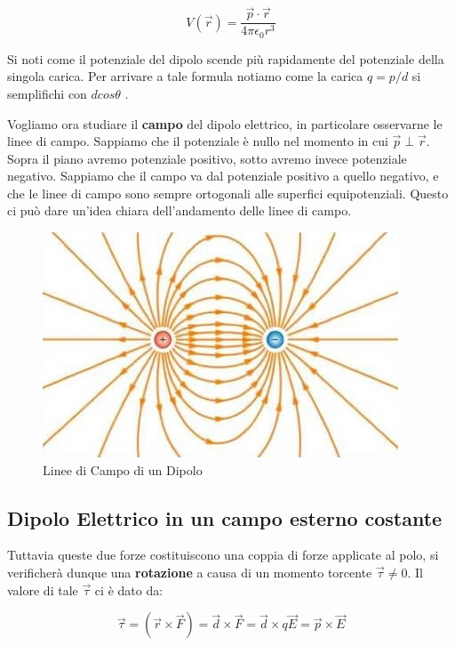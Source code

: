 $$ 
V(\vec{r}) = \frac{\vec{p} \cdot \vec{r}}{4\pi\epsilon_0 r^3}
$$ 

Si noti come il potenziale del dipolo scende più rapidamente del potenziale della singola carica. Per arrivare a tale formula notiamo come la carica $q = p/d$ si semplifichi con $dcos\theta$ .


Vogliamo ora studiare il \textbf{campo} del dipolo elettrico, in particolare osservarne le linee di campo. Sappiamo che il potenziale è nullo nel momento in cui $\vec{p} \perp \vec{r}$. Sopra il piano avremo potenziale positivo, sotto avremo invece potenziale negativo. Sappiamo che il campo va dal potenziale positivo a quello negativo, e che le linee di campo sono sempre ortogonali alle superfici equipotenziali. Questo ci può dare un'idea chiara dell'andamento delle linee di campo.

\begin{figure}[H]
	\centering
	\includegraphics[width=0.5\linewidth]{Media/linee_campo_dipolo}
	\caption{Linee di Campo di un Dipolo}
	\label{fig:lineecampodipolo}
\end{figure}

\subsection{Dipolo Elettrico in un campo esterno costante}

Tuttavia queste due forze costituiscono una coppia di forze applicate al polo, si verificherà dunque una \textbf{rotazione} a causa di un momento torcente $\vec{\tau} \ne 0$. Il valore di tale $\vec{\tau}$ ci è dato da: 

$$ 
\vec{\tau} = \left(\vec{r} \times \vec{F} \right) = \vec{d} \times \vec{F}  = \vec{d} \times q\vec{E}  = \vec{p}  \times \vec{E}
$$

